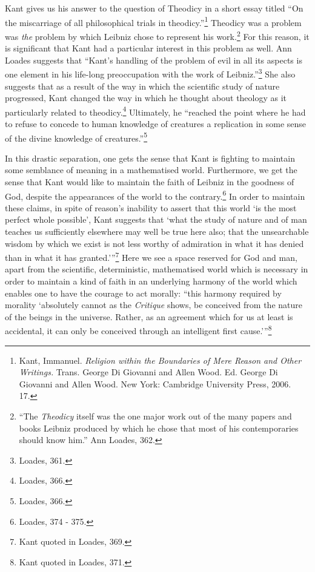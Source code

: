\documentclass[12pt]{article}
\begin{document}
	Kant gives us his answer to the question of Theodicy in a short essay titled ``On the miscarriage of all philosophical trials in theodicy.''\footnote{Kant, Immanuel. \emph{Religion within the Boundaries of Mere Reason and Other Writings.} Trans. George Di Giovanni and Allen Wood. Ed. George Di Giovanni and Allen Wood. New York: Cambridge University Press, 2006. 17.} Theodicy was a problem was \emph{the} problem by which Leibniz chose to represent his work.\footnote{``The \emph{Theodicy} itself was the one major work out of the many papers and books Leibniz produced by which he chose that most of his contemporaries should know him.'' Ann Loades, 362.} For this reason, it is significant that Kant had a particular interest in this problem as well. Ann Loades suggests that ``Kant's handling of the problem of evil in all its aspects is one element in his life-long preoccupation with the work of Leibniz.''\footnote{Loades, 361.} She also suggests that as a result of the way in which the scientific study of nature progressed, Kant changed the way in which he thought about theology as it particularly related to theodicy.\footnote{Loades, 366.} Ultimately, he ``reached the point where he had to refuse to concede to human knowledge of creatures a replication in some sense of the divine knowledge of creatures.''\footnote{Loades, 366.} 
	
	In this drastic separation, one gets the sense that Kant is fighting to maintain some semblance of meaning in a mathematised world. Furthermore, we get the sense that Kant would like to maintain the faith of Leibniz in the goodness of God, despite the appearances of the world to the contrary.\footnote{Loades, 374 - 375.} In order to maintain these claims, in spite of reason's inability to assert that this world `is the most perfect whole possible', Kant suggests that `what the study of nature and of man teaches us sufficiently elsewhere may well be true here also; that the unsearchable wisdom by which we exist is not less worthy of admiration in what it has denied than in what it has granted.'\thinspace''\footnote{Kant quoted in Loades, 369.}  Here we see a space reserved for God and man, apart from the scientific, deterministic, mathematised world which is necessary in order to maintain a kind of faith in an underlying harmony of the world which enables one to have the courage to act morally: ``this harmony required by morality `absolutely cannot as the \emph{Critique} shows, be conceived from the nature of the beings in the universe. Rather, as an agreement which for us at least is accidental, it can only be conceived through an intelligent first cause.'\thinspace''\footnote{Kant quoted in Loades, 371.} 
	
\end{document}
